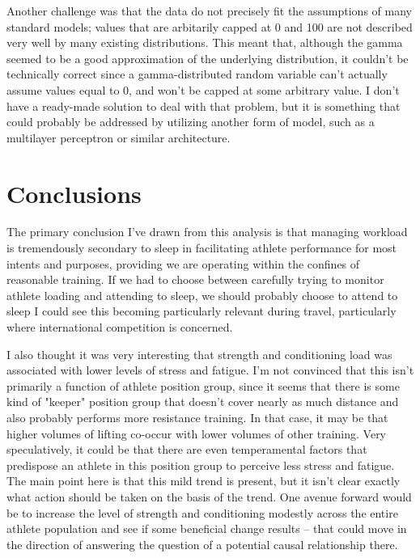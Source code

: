 \documentclass{article}
\begin{document}
		Another challenge was that the data do not precisely fit the assumptions
		of many standard models; values that are arbitarily capped at 0 and 100
		are not described very well by many existing distributions. This meant that,
		although the gamma seemed to be a good approximation of the underlying
		distribution, it couldn't be technically correct since a gamma-distributed
		random variable can't actually assume values equal to 0, and won't be
		capped at some arbitrary value. I don't have a ready-made solution to deal
		with that problem, but it is something that could probably be addressed
		by utilizing another form of model, such as a multilayer perceptron or
		similar architecture.

	\section{Conclusions}

		The primary conclusion I've drawn from this analysis is that managing
		workload is tremendously secondary to sleep in facilitating athlete
		performance for most intents and purposes, providing we are operating
		within the confines of reasonable training. If we had to choose between
		carefully trying to monitor athlete loading and attending to
		sleep, we should probably choose to attend to sleep I could see this
		becoming particularly relevant during travel, particularly where
		international competition is concerned.

		I also thought it was very interesting that strength and conditioning
		load was associated with lower levels of stress and fatigue. I'm not
		convinced that this isn't primarily a function of athlete position
		group, since it seems that there is some kind of "keeper" position group
		that doesn't cover nearly as much distance and also probably performs
		more resistance training. In that case, it may be that higher volumes of
		lifting co-occur with lower volumes of other training. Very speculatively,
		it could be that there are even temperamental factors that predispose
		an athlete in this position group to perceive less stress and fatigue.
		The main point here is that this mild trend is present, but it isn't
		clear exactly what action should be taken on the basis of the trend.
		One avenue forward would be to increase the level of strength and conditioning
		modestly across the entire athlete population and see if some beneficial
		change results -- that could move in the direction of answering the
		question of a potential causal relationship there.
\end{document}
